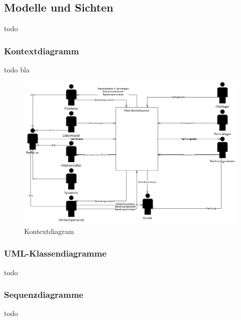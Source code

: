 \subsection{Modelle und Sichten}
todo


\subsubsection{Kontextdiagramm}
todo bla
\begin{figure}[H]
	\includegraphics[width=1.0\linewidth]{Images/kontextdiagram}
	\caption{Kontextdiagram}
	\label{fig:kontextdiagram}
\end{figure}


\subsubsection{UML-Klassendiagramme}
todo


\subsubsection{Sequenzdiagramme}
todo


